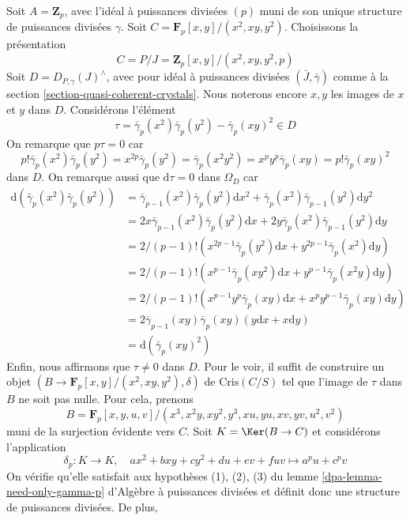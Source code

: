 \begin{example}
\label{example-torsion}
Soit $A = \mathbf{Z}_p$, avec l'idéal à puissances divisées $(p)$ muni de
son unique structure de puissances divisées $\gamma$. Soit
$C = \mathbf{F}_p[x, y]/(x^2, xy, y^2)$. Choisissons la présentation
$$
C = P/J = \mathbf{Z}_p[x, y]/(x^2, xy, y^2, p)
$$
Soit $D = D_{P, \gamma}(J)^\wedge$, avec pour idéal à puissances divisées
$(\bar J, \bar \gamma)$ comme à la section \ref{section-quasi-coherent-crystals}.
Nous noterons encore $x, y$ les images de $x$ et $y$ dans $D$.
Considérons l'élément
$$
\tau = \bar\gamma_p(x^2)\bar\gamma_p(y^2) - \bar\gamma_p(xy)^2 \in D
$$
On remarque que $p\tau = 0$ car
$$
p! \bar\gamma_p(x^2) \bar\gamma_p(y^2) =
x^{2p} \bar\gamma_p(y^2) = \bar\gamma_p(x^2y^2) =
x^py^p \bar\gamma_p(xy) = p! \bar\gamma_p(xy)^2
$$
dans $D$. On remarque aussi que $\text{d}\tau = 0$ dans $\Omega_D$ car
\begin{align*}
\text{d}(\bar\gamma_p(x^2) \bar\gamma_p(y^2))
& =
\bar\gamma_{p - 1}(x^2)\bar\gamma_p(y^2)\text{d}x^2 +
\bar\gamma_p(x^2)\bar\gamma_{p - 1}(y^2)\text{d}y^2 \\
& =
2 x \bar\gamma_{p - 1}(x^2)\bar\gamma_p(y^2)\text{d}x +
2 y \bar\gamma_p(x^2)\bar\gamma_{p - 1}(y^2)\text{d}y \\
& =
2/(p - 1)!( x^{2p - 1} \bar\gamma_p(y^2)\text{d}x +
y^{2p - 1} \bar\gamma_p(x^2)\text{d}y ) \\
& =
2/(p - 1)!
(x^{p - 1} \bar\gamma_p(xy^2)\text{d}x +
y^{p - 1} \bar\gamma_p(x^2y)\text{d}y) \\
& =
2/(p - 1)!
(x^{p - 1}y^p \bar\gamma_p(xy)\text{d}x +
x^py^{p - 1} \bar\gamma_p(xy)\text{d}y) \\
& =
2 \bar\gamma_{p - 1}(xy) \bar\gamma_p(xy)(y\text{d}x + x \text{d}y) \\
& = 
\text{d}(\bar\gamma_p(xy)^2)
\end{align*}
Enfin, nous affirmons que $\tau \not = 0$ dans $D$. Pour le voir, il suffit de
construire un objet $(B \to \mathbf{F}_p[x, y]/(x^2, xy, y^2), \delta)$
de $\text{Cris}(C/S)$ tel que l'image de $\tau$ dans $B$ ne soit pas nulle.
Pour cela, prenons
$$
B = \mathbf{F}_p[x, y, u, v]/(x^3, x^2y, xy^2, y^3, xu, yu, xv, yv, u^2, v^2)
$$
muni de la surjection évidente vers $C$. Soit $K = \Ker(B \to C)$ et
considérons l'application
$$
\delta_p : K \longrightarrow K,\quad
ax^2 + bxy + cy^2 + du + ev + fuv \longmapsto a^pu + c^pv
$$
On vérifie qu'elle satisfait aux hypothèses (1), (2), (3) du
lemme \ref{dpa-lemma-need-only-gamma-p} d'Algèbre à puissances divisées
et définit donc une structure de puissances divisées. De plus,

\end{example}
